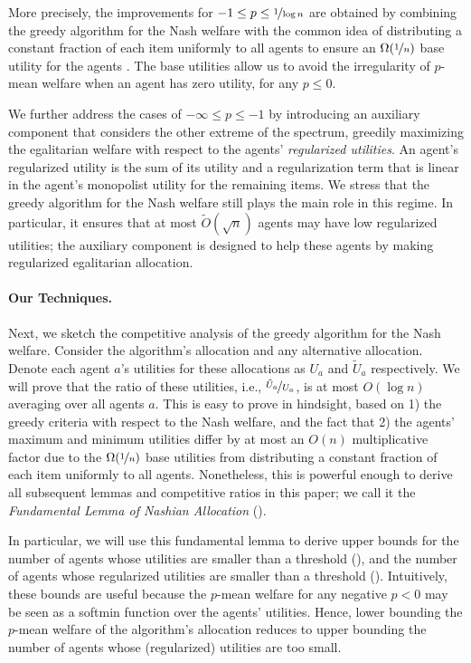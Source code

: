 \documentclass[11pt,letterpaper]{article}
\newcommand{\utility}{U}
\begin{document}
More precisely, the improvements for $-1 \le p \le \nicefrac{1}{\log n}$ are obtained by combining the greedy algorithm for the Nash welfare with the common idea of distributing a constant fraction of each item uniformly to all agents to ensure an $\Omega(\nicefrac{1}{n})$ base utility for the agents \citep[see, e.g.,][for previous analyses of this algorithm for $p = 0$]{BanerjeeGGJ:SODA:2022, HuangLSW:WINE:2023}.
The base utilities allow us to avoid the irregularity of $p$-mean welfare when an agent has zero utility, for any $p \le 0$. 

We further address the cases of $-\infty \le p \le -1$ by introducing an auxiliary component that considers the other extreme of the spectrum, greedily maximizing the egalitarian welfare with respect to the agents' \emph{regularized utilities}.
An agent's regularized utility is the sum of its utility and a regularization term that is linear in the agent's monopolist utility for the remaining items.
We stress that the greedy algorithm for the Nash welfare still plays the main role in this regime.
In particular, it ensures that at most $\tilde{O}(\sqrt{n})$ agents may have low regularized utilities; 
the auxiliary component is designed to help these agents by making regularized egalitarian allocation.

\vspace{-3pt}
\paragraph{Our Techniques.}
Next, we sketch the competitive analysis of the greedy algorithm for the Nash welfare.
Consider the algorithm's allocation and any alternative allocation.
Denote each agent $a$'s utilities for these allocations as $\utility_a$ and $\tilde{\utility}_a$ respectively.
We will prove that the ratio of these utilities, i.e., $\nicefrac{\tilde{\utility}_a}{\utility_a}$, is at most $O( \log n )$ averaging over all agents $a$.
This is easy to prove in hindsight, based on 1) the greedy criteria with respect to the Nash welfare, and the fact that 2) the agents' maximum and minimum utilities differ by at most an $O(n)$ multiplicative factor due to the $\Omega(\nicefrac{1}{n})$ base utilities from distributing a constant fraction of each item uniformly to all agents.
Nonetheless, this is powerful enough to derive all subsequent lemmas and competitive ratios in this paper; 
we call it the \emph{Fundamental Lemma of Nashian Allocation} ().

In particular, we will use this fundamental lemma to derive upper bounds for the number of agents whose utilities are smaller than a threshold (), and the number of agents whose regularized utilities are smaller than a threshold ().
Intuitively, these bounds are useful because the $p$-mean welfare for any negative $p<0$ may be seen as a softmin function over the agents' utilities.
Hence, lower bounding the $p$-mean welfare of the algorithm's allocation reduces to upper bounding the number of agents whose (regularized) utilities are too small.
\end{document}

